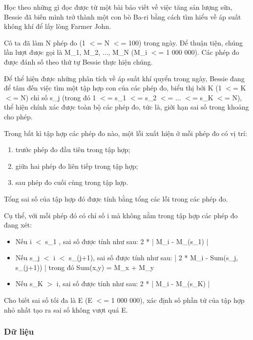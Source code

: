 



   Học theo những gì đọc được từ một bài báo viết về việc tăng sản lượng sữa, Bessie đã biến mình trở thành một con bò Ba-ri bằng cách tìm hiểu về áp suất không khí để lấy lòng Farmer John.  

   Cô ta đã làm N phép đo (1 $<$= N $<$= 100) trong ngày. Để thuận tiện, chúng lần lượt được gọi là M\_1, M\_2, ..., M\_N (M\_i $<$= 1 000 000). Các phép đo được đánh số theo thứ tự Bessie thực hiện chúng.  

   Để thể hiện được những phân tích về áp suất khí quyển trong ngày, Bessie đang để tâm đến việc tìm một tập hợp con của các phép đo, biểu thị bởi K (1 $<$= K $<$= N) chỉ số s\_j (trong đó 1 $<$= s\_1 $<$= s\_2 $<$= ... $<$= s\_K $<$= N), thể hiện chính xác được toàn bộ các phép đo, tức là, giới hạn sai số trong khoảng cho phép.  

   Trong bất kì tập hợp các phép đo nào, một lỗi xuất hiện ở mỗi phép đo có vị trí:  
\begin{enumerate}
	\item     trước phép đo đầu tiên trong tập hợp;   
	\item     giữa hai phép đo liên tiếp trong tập hợp;   
	\item     sau phép đo cuối cùng trong tập hợp.   
\end{enumerate}

   Tổng sai số của tập hợp đó được tính bằng tổng các lỗi trong các phép đo.  

   Cụ thể, với mỗi phép đó có chỉ số i mà không nằm trong tập hợp các phép đo đang xét:  
\begin{itemize}
	\item     Nếu i $<$ s\_1 , sai số được tính như sau: 2 * | M\_i - M\_(s\_1) |   
	\item     Nếu s\_j $<$ i $<$ s\_(j+1), sai số được tính như sau: | 2 * M\_i - Sum(s\_j, s\_(j+1)) |      trong đó Sum(x,y) = M\_x + M\_y   
	\item     Nếu s\_K $>$ i, sai số được tính như sau: 2 * | M\_i - M\_(s\_K) |   
\end{itemize}

   Cho biết sai số tối đa là E (E $<$= 1 000 000), xác định số phần tử của tập hợp nhỏ nhất tạo ra sai số không vượt quá E.  

\subsubsection{   Dữ liệu  }

